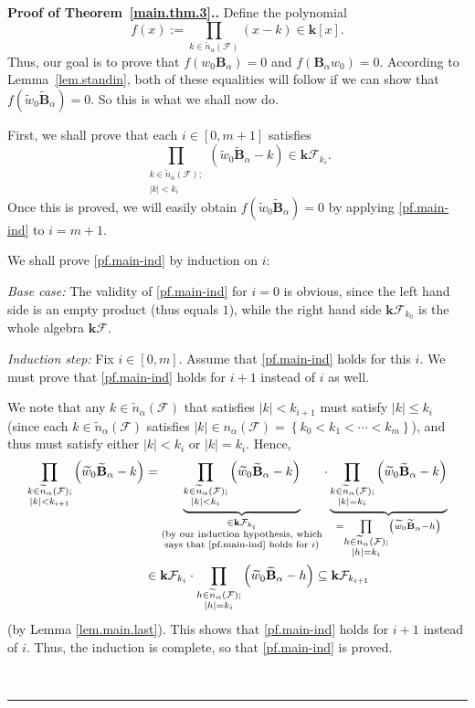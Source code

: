 \documentclass[12pt]{article}
\theoremstyle{definition}%
\theoremstyle{definition}%
\theoremstyle{remark}%
\newcommand{\tup}[1]{\left( #1 \right)}
\newcommand{\sbr}[1]{\left[ #1 \right]} %
\newcommand{\interval}[1]{\left[ #1 \right]} %
\newcommand{\set}[1]{\left\{ #1 \right\}}
\newcommand{\abs}[1]{\left| #1 \right|} %
\newcommand{\kk}{\mathbf{k}}
\newcommand{\kf}{\kk\mathcal{F}}
\newcommand{\BBa}{\mathbf{B}_{\alpha}}
\newcommand{\BBta}{\widetilde{\mathbf{B}}_{\alpha}}
\newcommand{\CF}{\mathcal{F}}
\newcommand{\wo}{w_0} %
\newcommand{\wotil}{\widetilde{w}_0}
\newcommand{\na}{n_{ \alpha } }%
\newcommand{\nna}{\widetilde{n}_{ \alpha } }%
\newenvironment{proof}[1][Proof]{\noindent\textbf{#1.} }{\ \rule{0.5em}{0.5em}}
\begin{document}
\begin{proof}[Proof of Theorem~\ref{main.thm.3}.]
Define the polynomial
\[
f\tup{x}
:= \prod_{k \in \nna\tup{\CF}} \tup{x - k}
\in \kk\sbr{x}.
\]
Thus, our goal is to prove that $f\tup{\wo\BBa} = 0$
and $f\tup{\BBa\wo} = 0$.
According to Lemma~\ref{lem.standin}, both of these
equalities will follow if we can show that
$f\tup{\wotil \BBta} = 0$.
So this is what we shall now do.

First, we shall prove that each
$i \in \interval{0, m+1}$ satisfies
\begin{equation}
\prod_{\substack{k \in \nna\tup{\CF};\\
\abs{k} < k_i}} \tup{ \wotil\BBta - k }
\in \kf_{k_i}.
\label{pf.main-ind}
\end{equation}
Once this is proved, we will easily obtain
$f\tup{\wotil \BBta} = 0$ by applying
\eqref{pf.main-ind} to $i=m+1$.

We shall prove \eqref{pf.main-ind} by induction on $i$:

\textit{Base case:} The validity of \eqref{pf.main-ind} for $i=0$ is obvious,
since the left hand side is an empty product (thus equals $1$), while the
right hand side $\kf_{k_{0}}$ is the whole algebra
$\kf$.

\textit{Induction step:} Fix $i\in \interval{0, m}$. Assume that
\eqref{pf.main-ind} holds for this $i$. We must prove that \eqref{pf.main-ind}
holds for $i+1$ instead of $i$ as well.

We note that any $k \in \nna\tup{\CF}$ that satisfies $\abs{k}
<k_{i+1}$ must satisfy $\abs{k} \leq k_i$
(since each $k \in \nna\tup{\CF}$ satisfies
$\abs{k} \in \na\tup{\CF} = \set{k_0 < k_1 < \cdots < k_m}$),
and thus
must satisfy either $\abs{k} < k_i$ or $\abs{k} = k_i$.
Hence,
\begin{align*}
\prod_{\substack{k \in \nna\tup{\CF};\\\abs{k}
<k_{i+1}}}\left(  \wotil\BBta-k\right)
& =\underbrace{\prod_{\substack{k \in \nna\tup{\CF};\\
\abs{k} < k_i}}\left(  \wotil\BBta-k\right)  }_{\substack{\in
\kf_{k_i}\\\text{(by our induction hypothesis,
which}\\\text{says that \eqref{pf.main-ind} holds for }i\text{)}}%
}\cdot\underbrace{\prod_{\substack{k \in \nna\tup{\CF};\\
\abs{k} = k_i}}\left(  \wotil\BBta-k\right)  }_{=
\prod\limits_{\substack{h \in \nna\tup{\CF};\\\abs{h} =k_i%
}}\left(  \wotil\BBta-h\right)  }\\
& \in\kf_{k_i}\cdot\prod_{\substack{h \in \nna\tup{\CF};
\\ \abs{h} = k_i}}\left(  \wotil\BBta-h\right)
\subseteq \kf_{k_{i+1}}
\end{align*}
(by Lemma \ref{lem.main.last}). This shows that \eqref{pf.main-ind} holds for
$i+1$ instead of $i$. Thus, the induction is complete, so that
\eqref{pf.main-ind} is proved.


\end{proof}
\end{document}
